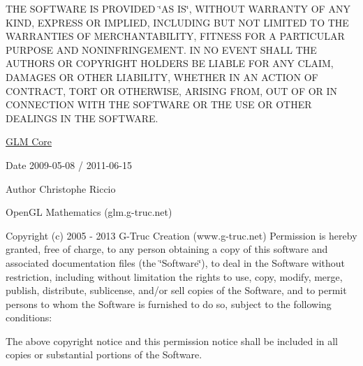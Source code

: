 T\+H\+E S\+O\+F\+T\+W\+A\+R\+E I\+S P\+R\+O\+V\+I\+D\+E\+D \char`\"{}\+A\+S I\+S\char`\"{}, W\+I\+T\+H\+O\+U\+T W\+A\+R\+R\+A\+N\+T\+Y O\+F A\+N\+Y K\+I\+N\+D, E\+X\+P\+R\+E\+S\+S O\+R I\+M\+P\+L\+I\+E\+D, I\+N\+C\+L\+U\+D\+I\+N\+G B\+U\+T N\+O\+T L\+I\+M\+I\+T\+E\+D T\+O T\+H\+E W\+A\+R\+R\+A\+N\+T\+I\+E\+S O\+F M\+E\+R\+C\+H\+A\+N\+T\+A\+B\+I\+L\+I\+T\+Y, F\+I\+T\+N\+E\+S\+S F\+O\+R A P\+A\+R\+T\+I\+C\+U\+L\+A\+R P\+U\+R\+P\+O\+S\+E A\+N\+D N\+O\+N\+I\+N\+F\+R\+I\+N\+G\+E\+M\+E\+N\+T. I\+N N\+O E\+V\+E\+N\+T S\+H\+A\+L\+L T\+H\+E A\+U\+T\+H\+O\+R\+S O\+R C\+O\+P\+Y\+R\+I\+G\+H\+T H\+O\+L\+D\+E\+R\+S B\+E L\+I\+A\+B\+L\+E F\+O\+R A\+N\+Y C\+L\+A\+I\+M, D\+A\+M\+A\+G\+E\+S O\+R O\+T\+H\+E\+R L\+I\+A\+B\+I\+L\+I\+T\+Y, W\+H\+E\+T\+H\+E\+R I\+N A\+N A\+C\+T\+I\+O\+N O\+F C\+O\+N\+T\+R\+A\+C\+T, T\+O\+R\+T O\+R O\+T\+H\+E\+R\+W\+I\+S\+E, A\+R\+I\+S\+I\+N\+G F\+R\+O\+M, O\+U\+T O\+F O\+R I\+N C\+O\+N\+N\+E\+C\+T\+I\+O\+N W\+I\+T\+H T\+H\+E S\+O\+F\+T\+W\+A\+R\+E O\+R T\+H\+E U\+S\+E O\+R O\+T\+H\+E\+R D\+E\+A\+L\+I\+N\+G\+S I\+N T\+H\+E S\+O\+F\+T\+W\+A\+R\+E.

\hyperlink{group__core}{G\+L\+M Core}

\begin{DoxyDate}{Date}
2009-\/05-\/08 / 2011-\/06-\/15 
\end{DoxyDate}
\begin{DoxyAuthor}{Author}
Christophe Riccio
\end{DoxyAuthor}
Open\+G\+L Mathematics (glm.\+g-\/truc.\+net)

Copyright (c) 2005 -\/ 2013 G-\/\+Truc Creation (www.\+g-\/truc.\+net) Permission is hereby granted, free of charge, to any person obtaining a copy of this software and associated documentation files (the \char`\"{}\+Software\char`\"{}), to deal in the Software without restriction, including without limitation the rights to use, copy, modify, merge, publish, distribute, sublicense, and/or sell copies of the Software, and to permit persons to whom the Software is furnished to do so, subject to the following conditions\+:

The above copyright notice and this permission notice shall be included in all copies or substantial portions of the Software.

